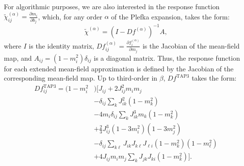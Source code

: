 \documentclass[letterpaper]{article} %
\begin{document}
For algorithmic purposes, we are also interested in the response function $\tilde{\chi}^{(\alpha)}_{ij} = \frac{\partial m_i}{\partial b_j}$, which, for any order $\alpha$ of the Plefka expansion, takes the form:
\begin{equation}
\tilde{\chi}^{(\alpha)} = (I-Df^{(\alpha)})^{-1}A,
\end{equation}
where $I$ is the identity matrix, $Df^{(\alpha)}_{ij} = \frac{\partial f^{(\alpha)}_i}{\partial m_j}$ is the Jacobian of the mean-field map, and $A_{ij} = (1-m_i^2)\delta_{ij}$ is a diagonal matrix. Thus, the response function for each extended mean-field approximation is defined by the Jacobian of the corresponding mean-field map. Up to third-order in $\beta$, $Df^{\text{TAP3}}$ takes the form:
\begin{align}
\label{Jacobian}
Df^{\text{TAP3}}_{ij} = (1-m_i^2 &) \Bigg[ J_{ij}  + 2 J_{ij}^2m_im_j \nonumber \\
& - \delta_{ij}\sum_k J_{ik}^2(1-m_k^2) \nonumber \\
& - 4 m_i\delta_{ij}\sum_k J_{ik}^3 m_k(1-m_k^2) \nonumber \\
& + \frac{2}{3} J_{ij}^3(1-3m_i^2)(1-3m_j^2) \nonumber \\
& -  \delta_{ij} \sum_{k\ell} J_{ik}J_{k\ell}J_{\ell i} (1-m_k^2)(1-m_{\ell}^2) \nonumber \\
& + 4 J_{ij}m_i m_j \sum_k J_{jk}J_{ki} (1-m_k^2) \Bigg].
\end{align}



\end{document}
